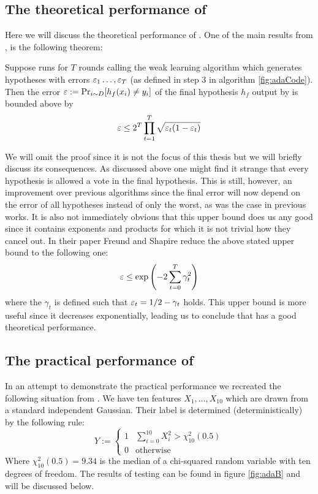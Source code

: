 \subsection{The theoretical performance of \adaB}
\label{subsec:AdaTheoPerf}
Here we will discuss the theoretical performance of \adaB. One of the main results from \cite{Freund1997}, is the following theorem: 
\begin{theorem}\label{thm:adaErr}\cite{Freund1997}
Suppose \adaB runs for $T$ rounds calling the weak learning algorithm \weak which generates hypotheses with errors $\varepsilon_1\ldots, \varepsilon_T$ (as defined in step 3 in algorithm \ref{fig:adaCode}). Then the error $\varepsilon:=\Pr_{i\sim D}[h_f(x_i)\neq y_i]$ of the final hypothesis $h_f$ output by \adaB is bounded above by $$\varepsilon\leq 2^T\prod^T_{t=1}\sqrt{\varepsilon_t(1-\varepsilon_t)}$$
\end{theorem}
We will omit the proof since it is not the focus of this thesis but we will briefly discuss its consequences. As discussed above one might find it strange that every hypothesis is allowed a vote in the final hypothesis. This is still, however, an improvement over previous algorithms since the final error will now depend on the error of all hypotheses instead of only the worst, as was the case in previous works. It is also not immediately obvious that this upper bound does us any good since it contains exponents and products for which it is not trivial how they cancel out. In their paper Freund and Shapire reduce the above stated upper bound to the following one: $$\varepsilon\leq \exp\left(-2\sum^T_{t=0}\gamma_t^2\right)$$ where the $\gamma_t$ is defined such that $\varepsilon_t=1/2-\gamma_t$ holds. This upper bound is more useful since it decreases exponentially, leading us to conclude that \adaB has a good theoretical performance.   

\subsection{The practical performance of \adaB}
\label{subsec:AdaPracPerf}
In an attempt to demonstrate the practical performance we recreated the following situation from \cite{Hastie2009}. We have ten features $X_1,\ldots,X_{10}$ which are drawn from a standard independent Gaussian. Their label is determined (deterministically) by the following rule: $$Y:=\begin{cases}
1 & \sum_{i=0}^{10} X^2_i > \chi_{10}^2(0.5)\\
0 & \text{otherwise}
\end{cases}$$ Where $\chi_{10}^2(0.5)=9.34$ is the median of a chi-squared random variable with ten degrees of freedom. The results of testing can be found in figure \ref{fig:adaB} and will be discussed below. 

